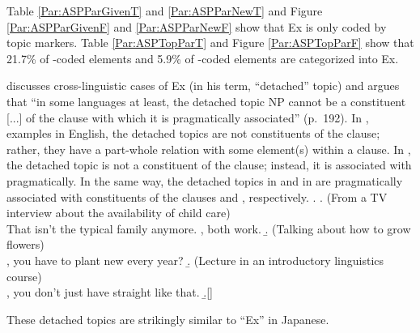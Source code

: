 Table \ref{Par:ASPParGivenT} and \ref{Par:ASPParNewT} and
Figure \ref{Par:ASPParGivenF} and \ref{Par:ASPParNewF}
show that Ex is only coded by topic markers.
Table \ref{Par:ASPTopParT} and Figure \ref{Par:ASPTopParF}
show that 21.7\% of -coded elements and
5.9\% of -coded elements are categorized into Ex.

discusses cross-linguistic cases of Ex (in his term, ``detached'' topic)
and argues that
``in some languages at least, the detached topic NP cannot be a constituent [...] of the clause with which it is pragmatically associated'' (p.~192).
In \Next, examples in English,
the detached topics are not constituents of the clause;
rather, they have a part-whole relation with some element(s) within a clause.
In \Next[a], the detached topic  is not a constituent of the clause;
instead, it is associated with  pragmatically.
In the same way, the detached topics  in \Next[b] and
 in \Next[c]
are pragmatically associated with constituents of the clauses  and , respectively.
%
\ex.
 \a. (From a TV interview about the availability of child care) \\
   That isn't the typical family anymore.
   ,
    both work.
 \b. (Talking about how to grow flowers) \\
   , you have to plant new  every year?
 \b. (Lecture in an introductory linguistics course) \\
   , you don't just have straight  like that.
  \b.[] \hfill{\cite[193]{lambrecht94}}

These detached topics are strikingly similar to
``Ex'' in Japanese.

